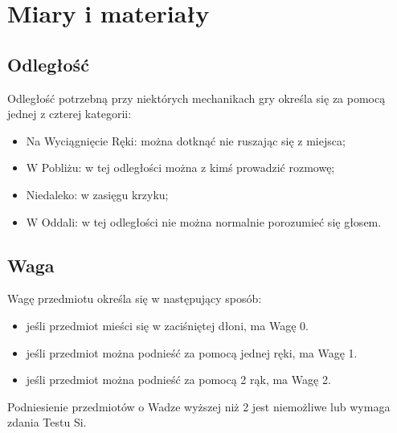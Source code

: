 \documentclass[10pt,a4paper]{book}
\begin{document}
\section{Miary i materiały}
\begin{multicols}{2}

\subsection*{Odległość}
Odległość potrzebną przy niektórych mechanikach gry określa się za pomocą jednej z czterej kategorii:
\begin{itemize}
	\item Na Wyciągnięcie Ręki: można dotknąć nie ruszając się z miejsca;
	\item W Pobliżu: w tej odległości można z kimś prowadzić rozmowę;
	\item Niedaleko: w zasięgu krzyku;
	\item W Oddali: w tej odległości nie można normalnie porozumieć się głosem.
\end{itemize}


\subsection*{Waga}
Wagę przedmiotu określa się w następujący sposób:
\begin{itemize}
	\item jeśli przedmiot mieści się w zaciśniętej dłoni, ma Wagę 0.
	\item jeśli przedmiot można podnieść za pomocą jednej ręki, ma Wagę 1.
	\item jeśli przedmiot można podnieść za pomocą 2 rąk, ma Wagę 2.
\end{itemize}

Podniesienie przedmiotów o Wadze wyższej niż 2 jest niemożliwe lub wymaga zdania Testu Si.

\end{multicols}
\end{document}

